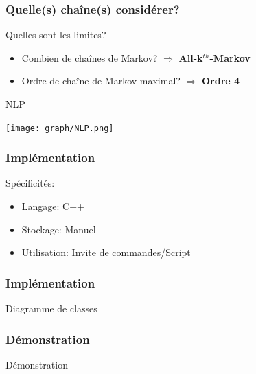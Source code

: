 \documentclass{beamer}
\begin{document}
            \begin{frame}
            \frametitle{Quelle(s) chaîne(s) considérer?}
            Quelles sont les limites?
            \begin{itemize}
            \pause[2]
            \item Combien de chaînes de Markov? \pause[3] $\Rightarrow$ \textbf{All-k}$^{th}$\textbf{-Markov}
            \pause[4]
            \item Ordre de chaîne de Markov maximal? \pause[6] $\Rightarrow$ \textbf{Ordre 4}
            \pause[5]
            \end{itemize}
            \begin{exampleblock}{NLP}
            \begin{center}
            \texttt{[image: graph/NLP.png]}
            \end{center}
            \end{exampleblock}
            \end{frame}
            \begin{frame}
            \frametitle{Implémentation}
            Spécificités:
            \begin{itemize}
            \pause
            \item Langage: \pause C++
            \pause
            \item Stockage: \pause Manuel
            \pause
            \item Utilisation: \pause Invite de commandes/Script
            \end{itemize}
            \end{frame}
            \begin{frame}
            \frametitle{Implémentation}
            \begin{block}{Diagramme de classes}
            \begin{center}
            \pause[2]
            \end{center}
            \end{block}
            \end{frame}
            \begin{frame}
            \frametitle{Démonstration}
            \begin{center}
            Démonstration
            \end{center}
            \end{frame}
\end{document}
